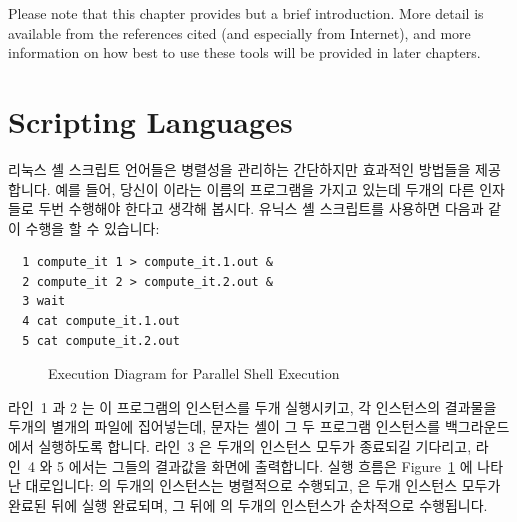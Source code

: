 Please note that this chapter provides but a brief introduction.
More detail is available from the references cited (and especially
from Internet), and more information
on how best to use these tools will be provided in later chapters.
\fi

\section{Scripting Languages}
\label{sec:toolsoftrade:Scripting Languages}

리눅스 셸 스크립트 언어들은 병렬성을 관리하는 간단하지만 효과적인 방법들을
제공합니다.
예를 들어, 당신이  이라는 이름의 프로그램을 가지고 있는데 두개의
다른 인자들로 두번 수행해야 한다고 생각해 봅시다.
유닉스 셸 스크립트를 사용하면 다음과 같이 수행을 할 수 있습니다:

\vspace{5pt}
\begin{minipage}[t]{\columnwidth}
\scriptsize
\begin{verbatim}
  1 compute_it 1 > compute_it.1.out &
  2 compute_it 2 > compute_it.2.out &
  3 wait
  4 cat compute_it.1.out
  5 cat compute_it.2.out
\end{verbatim}
\end{minipage}
\vspace{5pt}

\begin{figure}[tb]
\centering
{}
\caption{Execution Diagram for Parallel Shell Execution}
\label{fig:toolsoftrade:Execution Diagram for Parallel Shell Execution}
\end{figure}

라인~1 과 2 는 이 프로그램의 인스턴스를 두개 실행시키고, 각 인스턴스의 결과물을 두개의 별개의 파일에 집어넣는데, \co{&} 문자는 셸이 그 두 프로그램 인스턴스를 백그라운드에서 실행하도록 합니다.
라인~3 은 두개의 인스턴스 모두가 종료되길 기다리고, 라인~4 와 5 에서는 그들의 결과값을 화면에 출력합니다.
실행 흐름은 Figure~\ref{fig:toolsoftrade:Execution Diagram for Parallel Shell Execution} 에 나타난 대로입니다:
 의 두개의 인스턴스는 병렬적으로 수행되고,  은 두개 인스턴스 모두가 완료된 뒤에 실행 완료되며, 그 뒤에 의 두개의 인스턴스가 순차적으로 수행됩니다.

